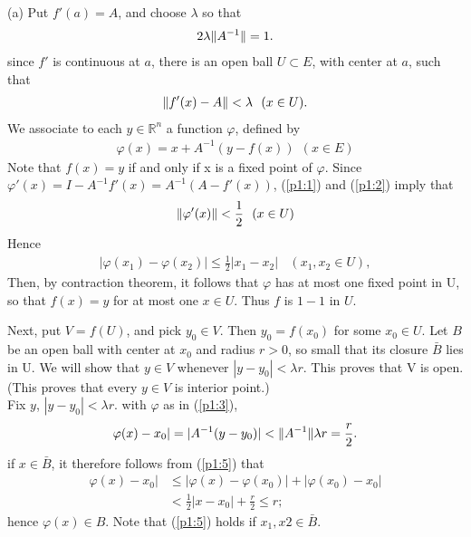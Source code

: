 \documentclass[a4paper,12pt]{article}
\makeatletter
\renewenvironment{proof}[1][\proofname] {\par\pushQED{\qed}\normalfont\topsep6\p@\@plus6\p@\relax\trivlist\item[\hskip\labelsep\bfseries#1\@addpunct{.}]\ignorespaces}{\popQED\endtrivlist\@endpefalse}
\theoremstyle{break}
\DeclarePairedDelimiter{\norm}{\lVert}{\rVert}
\makeatother
\begin{document}
\begin{proof} [Proof of theorem \ref{thm:InverseFunctionTheorem}]
    \indent (a) Put $f'(a)=A$, and choose $\lambda$ so that
    \begin{align}
        2\lambda\norm{A^{-1}}=1.
        \label{p1:1}
    \end{align}
    \indent since $f'$ is continuous at $a$, there is an open ball $U\subset E$, with center at $a$, such that
    \begin{align}
        \norm{f'(x)-A}<\lambda\ \ (x\in U).
        \label{p1:2}
    \end{align}
    We associate to each $y\in \mathbb{R}^n$ a function $\varphi$, defined by
    \begin{align}
        \varphi(x)=x+A^{-1}(y-f(x)) \ \ (x \in E)
        \label{p1:3}
    \end{align}
    Note that $f(x)=y$ if and only if x is a fixed point of $\varphi$.
    Since $\varphi'(x)=I-A^{-1}f'(x)=A^{-1}(A-f'(x))$, (\ref{p1:1}) and (\ref{p1:2}) imply that
    \begin{align}
        \norm{\varphi'(x)}<\frac{1}{2}\ \ (x\in U)
        \label{p1:4}
    \end{align}
    Hence
    \begin{align}
        |\varphi(x_1)-\varphi(x_2)|\leq \frac{1}{2}|x_1-x_2|\ \ \ \ (x_1,x_2 \in U),
        \label{p1:5}
    \end{align}
    Then, by contraction theorem, it follows that $\varphi$ has at most one fixed point in U, so that $f(x)=y$ for at most one $x\in U$.
    Thus $f$ is $1-1$ in $U$.

    Next, put $V=f(U)$, and pick $y_0 \in V$. Then $y_0=f(x_0)$ for some $x_0\in U$. Let $B$ be an open ball with center at $x_0$ and radius $r>0$, so small that its closure $\bar{B}$ lies in U. We will show that $y\in V$ whenever $|y-y_0|<\lambda r$. This proves that V is open. (This proves that every $y\in V$ is interior point.) \\

    Fix $y$, $|y-y_0| < \lambda r$. with $\varphi$ as in (\ref{p1:3}),
    \begin{align*}
        \varphi(x)-x_0|=|A^{-1}(y-y_0)|<\norm{A^{-1}}\lambda r=\frac{r}{2}.
    \end{align*}
    if $x \in \bar{B}$, it therefore follows from (\ref{p1:5}) that
    \begin{align*}
        \varphi(x)-x_0| &\leq |\varphi(x) - \varphi(x_0)|+|\varphi(x_0)-x_0| \\
        &<\frac{1}{2}|x-x_0|+\frac{r}{2}\leq r;
    \end{align*}
    hence $\varphi(x) \in B$. Note that (\ref{p1:5}) holds if $x_1,x2\in\bar{B}$.


\end{proof}
\end{document}
